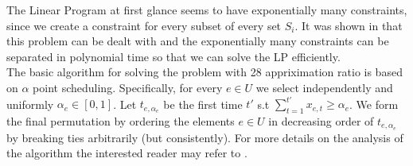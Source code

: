 The Linear Program at first glance seems to have exponentially many constraints, since we create a constraint for every subset of every set $S_i$. It was shown in \cite{BGK10} that this problem can be dealt with and the exponentially many constraints can be separated in polynomial time so that we can solve the LP efficiently. \\

The basic algorithm for solving the problem with 28 appriximation ratio is based on $\alpha$ point scheduling. Specifically, for every $e \in U$ we select independently and uniformly $\alpha_e \in [0,1]$. Let $t_{e,\alpha_e}$ be the first time $t'$ s.t $\sum_{t=1}^{t'} x_{e,t} \geq \alpha_e$. We form the final permutation by ordering the elements $e \in U$ in decreasing order of $t_{e,\alpha_e}$ by breaking ties arbitrarily (but consistently). For more details on the analysis of the algorithm the interested reader may refer to \cite{BGK10}.